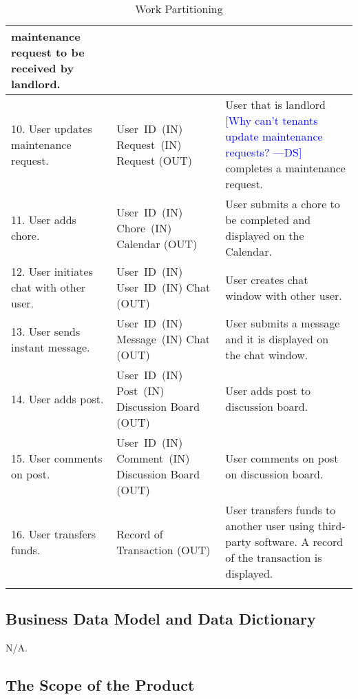 \documentclass[12pt]{article}
\newcommand{\authornote}[3]{\textcolor{#1}{[#3 ---#2]}}
\newcommand{\authornote}[3]{}
\newcommand{\ds}[1]{\authornote{blue}{DS}{#1}}
\begin{document}
\begin{longtable}{|p{5cm}|p{5cm}|p{5cm}|}
maintenance request to be received by landlord. \\
\hline
10. User updates maintenance request. & \mbox{User ID (IN)} \linebreak 
\mbox{Request (IN)} \linebreak Request (OUT) & User that is landlord 
\ds{Why can't tenants update maintenance requests?}
completes a 
maintenance request. \\
\hline
11. User adds chore. & \mbox{User ID (IN)} \linebreak \mbox{Chore (IN)} 
\linebreak Calendar (OUT) & User submits a chore to be completed and displayed 
on the Calendar. \\
\hline
12. User initiates chat with other user. & \mbox{User ID (IN)} \linebreak 
\mbox{User ID (IN)} \linebreak Chat (OUT) & User creates chat window with other 
user. \\
\hline
13. User sends instant message. & \mbox{User ID (IN)} \linebreak \mbox{Message 
(IN)} \linebreak Chat (OUT) & User submits a message  and it is displayed 
on the chat window. \\
\hline
14. User adds post. & \mbox{User ID (IN)} \linebreak \mbox{Post (IN)} \linebreak 
Discussion Board (OUT) & User adds post to discussion board. \\
\hline
15. User comments on post. & \mbox{User ID (IN)} \linebreak \mbox{Comment (IN)} 
\linebreak Discussion Board (OUT) & User comments on post on discussion board. 
\\
\hline
16. User transfers funds. & Record of Transaction (OUT) & User transfers funds 
to another user using third-party software. A record of the transaction is 
displayed. \\
\hline
\caption{Work Partitioning}
\label{tab:workpartition}
\end{longtable}
	
\subsection{Business Data Model and Data Dictionary}
N/A.

\subsection{The Scope of the Product}
\end{document}
